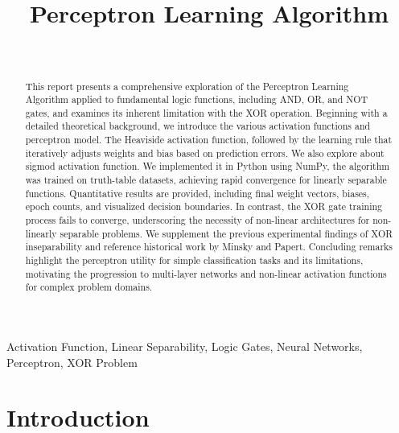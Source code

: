 \documentclass[a4paper, journal]{IEEEtran}
\begin{document}
\title{Perceptron Learning Algorithm}
\author{
 \\
}

\maketitle

\begin{abstract}
This report presents a comprehensive exploration of the Perceptron Learning Algorithm applied to fundamental logic functions, including AND, OR, and NOT gates, and examines its inherent limitation with the XOR operation. Beginning with a detailed theoretical background, we introduce the various activation functions and perceptron model. The Heaviside activation function, followed by the learning rule that iteratively adjusts weights and bias based on prediction errors. We also explore about sigmod activation function. We implemented it in Python using NumPy, the algorithm was trained on truth-table datasets, achieving rapid convergence for linearly separable functions. Quantitative results are provided, including final weight vectors, biases, epoch counts, and visualized decision boundaries. In contrast, the XOR gate training process fails to converge, underscoring the necessity of non-linear architectures for non-linearly separable problems. We supplement the previous experimental findings of XOR inseparability and reference historical work by Minsky and Papert. Concluding remarks highlight the perceptron utility for simple classification tasks and its limitations, motivating the progression to multi-layer networks and non-linear activation functions for complex problem domains.

\end{abstract}
\begin{IEEEkeywords}
    Activation Function, Linear Separability, Logic Gates, Neural Networks, Perceptron, XOR Problem
\end{IEEEkeywords}

\section{Introduction}
\end{document}

